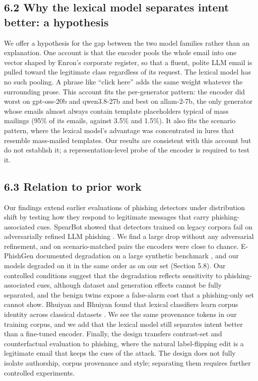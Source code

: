 \documentclass[11pt,letterpaper]{article}
\begin{document}
\subsection{6.2 Why the lexical model separates intent better: a hypothesis}

We offer a hypothesis for the gap between the two model families rather than an explanation. One account is that the encoder pools the whole email into one vector shaped by Enron's corporate register, so that a fluent, polite LLM email is pulled toward the legitimate class regardless of its request. The lexical model has no such pooling. A phrase like ``click here'' adds the same weight whatever the surrounding prose. This account fits the per-generator pattern: the encoder did worst on gpt-oss-20b and qwen3.8-27b and best on allam-2-7b, the only generator whose emails almost always contain template placeholders typical of mass mailings (95\% of its emails, against 3.5\% and 1.5\%). It also fits the scenario pattern, where the lexical model's advantage was concentrated in lures that resemble mass-mailed templates. Our results are consistent with this account but do not establish it; a representation-level probe of the encoder is required to test it.

\subsection{6.3 Relation to prior work}

Our findings extend earlier evaluations of phishing detectors under distribution shift by testing how they respond to legitimate messages that carry phishing-associated cues. SpearBot showed that detectors trained on legacy corpora fail on adversarially refined LLM phishing \cite{qi2025}. We find a large drop without any adversarial refinement, and on scenario-matched pairs the encoders were close to chance. E-PhishGen documented degradation on a large synthetic benchmark \cite{pajola2025}, and our models degraded on it in the same order as on our set (Section 5.8). Our controlled conditions suggest that the degradation reflects sensitivity to phishing-associated cues, although dataset and generation effects cannot be fully separated, and the benign twins expose a false-alarm cost that a phishing-only set cannot show. Bhuiyan and Bhuiyan found that lexical classifiers learn corpus identity across classical datasets \cite{bhuiyan2026}. We see the same provenance tokens in our training corpus, and we add that the lexical model still separates intent better than a fine-tuned encoder. Finally, the design transfers contrast-set \cite{gardner2020} and counterfactual \cite{kaushik2020} evaluation to phishing, where the natural label-flipping edit is a legitimate email that keeps the cues of the attack. The design does not fully isolate authorship, corpus provenance and style; separating them requires further controlled experiments.
\end{document}
